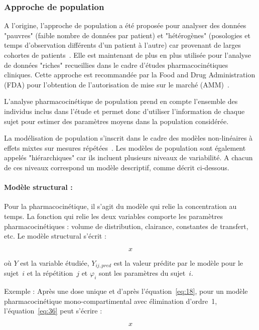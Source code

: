 \subsubsection{Approche de population}
A l'origine, l'approche de population a été proposée pour analyser des données "pauvres" (faible nombre de données par patient) et "hétérogènes" (posologies et temps d'observation différents d'un patient à l'autre) car provenant de larges cohortes de patients~\citep{REF8}. Elle est maintenant de plus en plus utilisée pour l'analyse de données "riches" recueillies dans le cadre d'études pharmacocinétiques cliniques. Cette approche est recommandée par la Food and Drug Administration (FDA) pour l'obtention de l'autorisation de mise sur le marché (\gls{AMM})~\citep{REF9}.

L'analyse pharmacocinétique de population prend en compte l'ensemble des individus inclus dans l'étude et permet donc d'utiliser l'information de chaque sujet pour estimer des paramètres moyens dans la population considérée.

La modélisation de population s'inscrit dans le cadre des modèles non-linéaires à effets mixtes sur mesures répétées~\citep{REF10}. Les modèles de population sont également appelés "hiérarchiques" car ils incluent plusieurs niveaux de variabilité. A chacun de ces niveaux correspond un modèle descriptif, comme décrit ci-dessous.

\paragraph*{Modèle structural :} Pour la pharmacocinétique, il s'agit du modèle qui relie la concentration au temps. La fonction qui relie les deux variables comporte les paramètres pharmacocinétiques : volume de distribution, clairance, constantes de transfert, etc. Le modèle structural s'écrit :

\begin{equation}
x
\label{eq:36}
\end{equation}

où $Y$ est la variable étudiée, $Y_{ij,pred}$ est la valeur prédite par le modèle pour le sujet~$i$ et la répétition~$j$ et $\varphi_i$ sont les paramètres du sujet~$i$.

Exemple : Après une dose unique et d'après l'équation~\ref{eq:18}, pour un modèle pharmacocinétique mono-compartimental avec élimination d'ordre~1, l'équation~\ref{eq:36} peut s'écrire :

\begin{equation}
x
\label{eq:37}
\end{equation}

